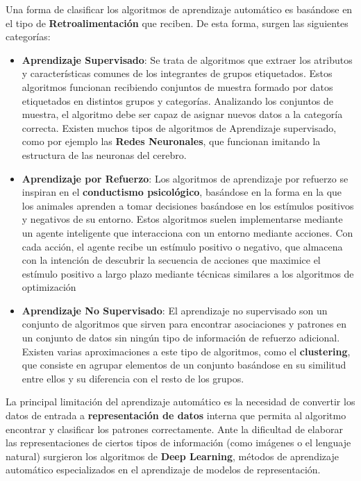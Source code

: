 Una forma de clasificar los algoritmos de aprendizaje automático es basándose en el tipo de \textbf{Retroalimentación} que reciben. De esta forma, surgen las siguientes categorías:
\begin{itemize}
\item \textbf{Aprendizaje Supervisado}: Se trata de algoritmos que extraer los atributos y características comunes de los integrantes de grupos etiquetados. Estos algoritmos funcionan recibiendo conjuntos de muestra formado por datos etiquetados en distintos grupos y categorías. Analizando los conjuntos de muestra, el algoritmo debe ser capaz de asignar nuevos datos a la categoría correcta. Existen muchos tipos de algoritmos de Aprendizaje supervisado, como por ejemplo las \textbf{Redes Neuronales}, que funcionan imitando la estructura de las neuronas del cerebro.
\item \textbf{Aprendizaje por Refuerzo}: Los algoritmos de aprendizaje por refuerzo se inspiran en el \textbf{conductismo psicológico}, basándose en la forma en la que los animales aprenden a tomar decisiones basándose en los estímulos positivos y negativos de su entorno. Estos algoritmos suelen implementarse mediante un agente inteligente que interacciona con un entorno mediante acciones. Con cada acción, el agente recibe un estímulo positivo o negativo, que almacena con la intención de descubrir la secuencia de acciones que maximice el estímulo positivo a largo plazo mediante técnicas similares a los algoritmos de optimización
\item \textbf{Aprendizaje No Supervisado}: El aprendizaje no supervisado son un conjunto de algoritmos que sirven para encontrar asociaciones y patrones en un conjunto de datos sin ningún tipo de información de refuerzo adicional. Existen varias aproximaciones a este tipo de algoritmos, como el \textbf{clustering}, que consiste en agrupar elementos de un conjunto basándose en su similitud entre ellos y su diferencia con el resto de los grupos.
\end{itemize} 

La principal limitación del aprendizaje automático es la necesidad de convertir los datos de entrada a \textbf{representación de datos} interna que permita al algoritmo encontrar y clasificar los patrones correctamente. Ante la dificultad de elaborar las representaciones de ciertos tipos de información (como imágenes o el lenguaje natural) surgieron los algoritmos de \textbf{Deep Learning}, métodos de aprendizaje automático especializados en el aprendizaje de modelos de representación.

